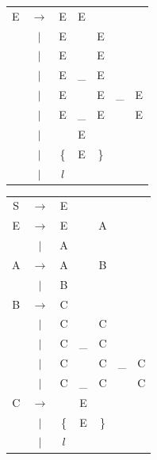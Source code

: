 \documentclass[a4paper, 10pt, twoside]{article}
\begin{document}
\begin{table}[H]
\begin{tabular} {c c c c c c c}

E & $\rightarrow$ & E & E                 &   & & \\
  & $|$           & E & \detokenize{/}    & E & & \\
  & $|$           & E & \detokenize{^}    & E & & \\
  & $|$           & E & \_                & E & & \\
  & $|$           & E & \detokenize{^}    & E & \_  & E \\
  & $|$           & E & \_                & E & \detokenize{^} & E \\
  & $|$           & \detokenize{(}        & E & \detokenize{)} & & \\
  & $|$           & \{                    & E & \} & & \\
  & $|$           & $l$ & & & & \\
\end{tabular}
\quad \quad \quad \quad \quad \quad \quad \quad \quad \quad
\begin{tabular} {c c c c c c c}

S & $\rightarrow$ & E &                   &   & & \\
E & $\rightarrow$ & E & \detokenize{/}    & A & & \\
  & $|$           & A &                   &   & & \\
A & $\rightarrow$ & A &                   & B & & \\
  & $|$           & B &                   &   & & \\
B & $\rightarrow$ & C &                   &   & & \\
  & $|$           & C & \detokenize{^}    & C & & \\
  & $|$           & C & \_                & C & & \\
  & $|$           & C & \detokenize{^}    & C & \_  & C \\
  & $|$           & C & \_                & C & \detokenize{^} & C \\
C & $\rightarrow$ & \detokenize{(}        & E & \detokenize{)} & & \\
  & $|$           & \{                    & E & \} & & \\
  & $|$           & $l$                  & & & & \\

\end{tabular}
\end{table}
\end{document}
